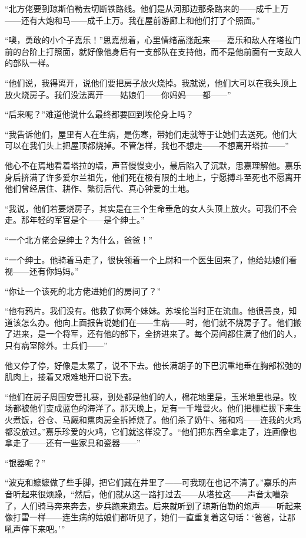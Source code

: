 \par “北方佬要到琼斯伯勒去切断铁路线。他们是从河那边那条路来的——成千上万——还有大炮和马——成千上万。我在屋前游廊上和他们打了个照面。”
\par “噢，勇敢的小个子嘉乐！”思嘉想着，心里情绪高涨起来——嘉乐和敌人在塔拉门前的台阶上打照面，就好像他身后有一支部队在支持他，而不是他前面有一支敌人的部队一样。
\par “他们说，我得离开，说他们要把房子放火烧掉。我就说，他们大可以在我头顶上放火烧房子。我们没法离开——姑娘们——你妈妈——都——”
\par “后来呢？”难道他说什么最终都要回到埃伦身上吗？
\par “我告诉他们，屋里有人在生病，是伤寒，带她们走就等于让她们去送死。他们大可以在我们头上把屋顶都烧掉。不管怎样，我也不想走——不想离开塔拉——”
\par 他心不在焉地看着塔拉的墙，声音慢慢变小，最后陷入了沉默，思嘉理解他。嘉乐身后挤满了许多爱尔兰祖先，他们死在极有限的土地上，宁愿搏斗至死也不愿离开他们曾经居住、耕作、繁衍后代、真心钟爱的土地。
\par “我说，他们若要烧房子，其实是在三个生命垂危的女人头顶上放火。可我们不会走。那年轻的军官是个——是个绅士。”
\par “一个北方佬会是绅士？为什么，爸爸！”
\par “一个绅士。他骑着马走了，很快领着一个上尉和一个医生回来了，他给姑娘们看视——还有你妈妈。”
\par “你让一个该死的北方佬进她们的房间了？”
\par “他有鸦片。我们没有。他救了你两个妹妹。苏埃伦当时正在流血。他很善良，知道该怎么办。他向上面报告说她们在——生病——时，他们就不烧房子了。他们搬了进来，是一个将军，还有他的部下，全挤进来了。每个房间都住满了他们的人，只有病室除外。士兵们——”
\par 他又停了停，好像是太累了，说不下去。他长满胡子的下巴沉重地垂在胸部松弛的肌肉上，接着又艰难地开口说下去。
\par “他们在房子周围安营扎寨，到处都是他们的人，棉花地里是，玉米地里也是。牧场都被他们变成蓝色的海洋了。那天晚上，足有一千堆营火。他们把栅栏拔下来生火煮饭，谷仓、马厩和熏肉房全拆掉烧了。他们杀了奶牛、猪和鸡——连我的火鸡都没放过。”嘉乐珍爱的火鸡，它们就这样没了。“他们把东西全拿走了，连画像也拿走了——还有一些家具和瓷器——”
\par “银器呢？”
\par “波克和嬷嬷做了些手脚，把它们藏在井里了——可我现在也记不清了。”嘉乐的声音听起来很烦躁，“然后，他们就从这一路打过去——从塔拉这——声音太嘈杂了，人们骑马奔来奔去，步兵跑来跑去。后来就听到了琼斯伯勒的炮声——听起来像打雷一样——连生病的姑娘们都听见了，她们一直重复着这句话：‘爸爸，让那吼声停下来吧。'”
